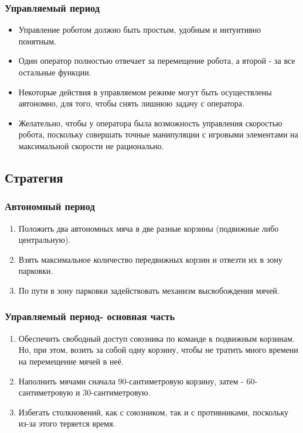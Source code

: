 \subsubsection{Управляемый период}
\begin{itemize}
	\item Управление роботом должно быть простым, удобным и интуитивно понятным.
	\item Один оператор полностью отвечает за перемещение робота, а второй - за все остальные функции.
	\item Некоторые действия в управляемом режиме могут быть осуществлены автономно, для того, чтобы снять лишнюю задачу с оператора.
	\item Желательно, чтобы у оператора была возможность управления скоростью робота, поскольку совершать точные манипуляции с игровыми элементами на максимальной скорости не рационально.
\end{itemize}

\fillpage

\subsection{Стратегия} 
\subsubsection{Автономный период}
\begin{enumerate}
    \item Положить два автономных мяча в две разные корзины (подвижные либо центральную).
	\item Взять максимальное количество передвижных корзин и отвезти их в зону парковки.
	\item По пути в зону парковки  задействовать механизм высвобождения мячей.
	         
\end{enumerate}
\subsubsection{Управляемый период-  основная часть}
\begin{enumerate}
	\item Обеспечить свободный доступ союзника по команде к подвижным корзинам. Но, при этом, возить за собой одну корзину, чтобы не тратить много времени на перемещение мячей в неё.
	\item Наполнить мячами сначала 90-сантиметровую корзину, затем - 60-сантиметровую и 30-сантиметровую.
	\item Избегать столкновений, как с союзником, так и с противниками, поскольку из-за этого теряется время.
\end{enumerate}

